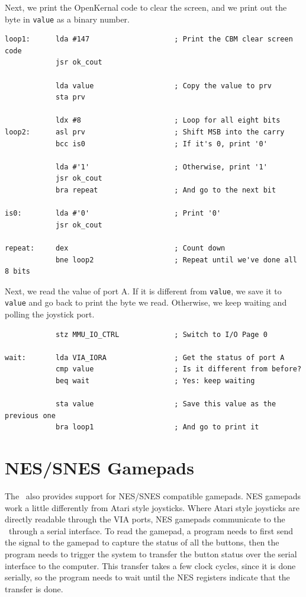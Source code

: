 Next, we print the OpenKernal code to clear the screen, and we print out the byte in \verb+value+ as a binary number.

\begin{verbatim}
loop1:      lda #147                    ; Print the CBM clear screen code
            jsr ok_cout

            lda value                   ; Copy the value to prv
            sta prv

            ldx #8                      ; Loop for all eight bits
loop2:      asl prv                     ; Shift MSB into the carry
            bcc is0                     ; If it's 0, print '0'

            lda #'1'                    ; Otherwise, print '1'
            jsr ok_cout
            bra repeat                  ; And go to the next bit

is0:        lda #'0'                    ; Print '0'
            jsr ok_cout

repeat:     dex                         ; Count down
            bne loop2                   ; Repeat until we've done all 8 bits
\end{verbatim}

Next, we read the value of port A. If it is different from \verb+value+, we save it to \verb+value+ and go back to print the byte we read. Otherwise, we keep waiting and polling the joystick port.

\begin{verbatim}
            stz MMU_IO_CTRL             ; Switch to I/O Page 0

wait:       lda VIA_IORA                ; Get the status of port A
            cmp value                   ; Is it different from before?
            beq wait                    ; Yes: keep waiting

            sta value                   ; Save this value as the previous one
            bra loop1                   ; And go to print it
\end{verbatim}

\section*{NES/SNES Gamepads}

The \jr\ also provides support for NES/SNES compatible gamepads. NES gamepads work a little differently from Atari style joysticks. Where Atari style joysticks are directly readable through the VIA ports, NES gamepads communicate to the \jr\ through a serial interface. To read the gamepad, a program needs to first send the signal to the gamepad to capture the status of all the buttons, then the program needs to trigger the system to transfer the button status over the serial interface to the computer. This transfer takes a few clock cycles, since it is done serially, so the program needs to wait until the NES registers indicate that the transfer is done.

